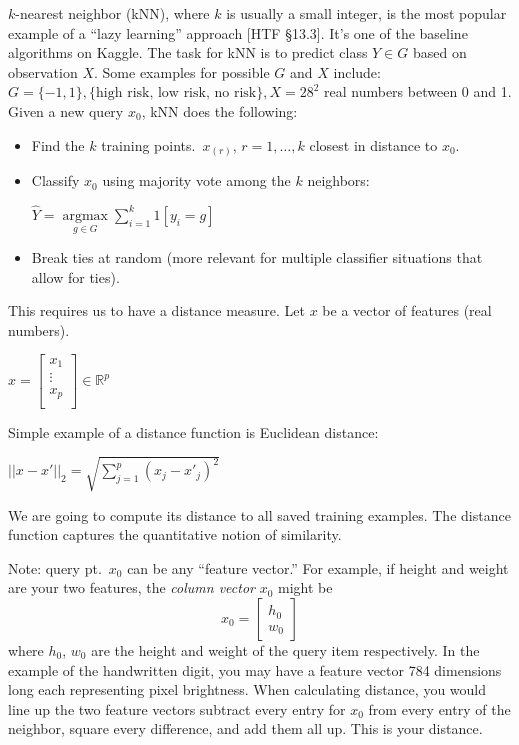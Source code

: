 \documentclass[a4paper]{article}
\begin{document}
$k$-nearest neighbor (kNN), where $k$ is usually a small integer, is the most popular example of a ``lazy learning'' approach [HTF \S 13.3].  It's one of the baseline algorithms on Kaggle.  The task for kNN is to predict class $Y \in G$ based on observation $X$. Some examples for possible $G$ and $X$ include: $G=\{-1,1\}, \{ \text{high risk, low risk, no risk}\}, X=28^2$ real numbers between 0 and 1. Given a new query $x_0$, kNN does the following:
\begin{itemize}
\item Find the $k$ training points.\ $x_{(r)}$, $r=1,\ldots,k$ closest in distance to $x_0$.
\item Classify $x_0$ using majority vote among the $k$ neighbors:
   
$\hat{Y}=\underset{g\in G}{\operatorname{argmax}} \sum_{i=1}^{k} 1[y_i=g]$
\item Break ties at random (more relevant for multiple classifier situations that allow for ties).
\end{itemize}

This requires us to have a distance measure. Let $x$ be a vector of features (real numbers). 

$x = \left[ \begin{array}{ccc} x_1\\ \vdots\\ x_p\\ \end{array} \right] \in \mathbb{R}^p$
   
Simple example of a distance function is Euclidean distance:

$||x-x'||_2 = \sqrt{\sum_{j=1}^{p} (x_j - x'_j)^2}$

We are going to compute its distance to all saved training examples. The distance function captures the quantitative notion of similarity.

Note: query pt.\ $x_0$ can be any ``feature vector.'' For example, if height and weight are your two features, the \emph{column vector} $x_0$ might be
$$x_0 = \left[\begin{matrix} h_0 \\ w_0 \end{matrix} \right]$$
where $h_0$, $w_0$ are the height and weight of the query item respectively. In the example of the handwritten digit, you may have a feature vector 784 dimensions long each representing pixel brightness. When calculating distance, you would line up the two feature vectors subtract every entry for $x_0$ from every entry of the neighbor, square every difference, and add them all up. This is your distance.
\end{document}
